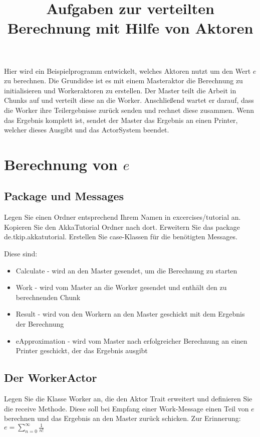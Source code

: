\documentclass[11pt]{tudexercise}
\title{Aufgaben zur verteilten Berechnung mit Hilfe von Aktoren}
\begin{document}
  \maketitle

  Hier wird ein Beispielprogramm entwickelt, welches Aktoren nutzt um den Wert $e$ zu berechnen.
Die Grundidee ist es mit einem Masteraktor die Berechnung zu initialisieren und Workeraktoren zu erstellen. Der Master teilt die Arbeit in Chunks auf und verteilt diese an die Worker. Anschließend wartet er darauf, dass die Worker ihre Teilergebnisse zurück senden und rechnet diese zusammen. Wenn das Ergebnis komplett ist, sendet der Master das Ergebnis an einen Printer, welcher dieses Ausgibt und das ActorSystem beendet.

\section{Berechnung von $e$}

\subsection{Package und Messages}

Legen Sie einen Ordner entsprechend Ihrem Namen in excercises/tutorial an. Kopieren Sie den AkkaTutorial Ordner nach dort. Erweitern Sie das package de.tkip.akkatutorial. Erstellen Sie case-Klassen für die benötigten Messages.

Diese sind:
\begin{itemize}
\item Calculate - wird an den Master gesendet, um die Berechnung zu starten
\item Work - wird vom Master an die Worker gesendet und enthält den zu berechnenden Chunk
\item Result - wird von den Workern an den Master geschickt mit dem Ergebnis der Berechnung
\item eApproximation - wird vom Master nach erfolgreicher Berechnung an einen Printer geschickt, der das Ergebnis ausgibt
\end{itemize}

\subsection{Der WorkerActor}

Legen Sie die Klasse Worker an, die den Aktor Trait erweitert und definieren Sie die receive Methode. Diese soll bei Empfang einer Work-Message einen Teil von $e$ berechnen und das Ergebnis an den Master zurück schicken. Zur Erinnerung: $e = \sum_{n=0}^{\infty}{\frac{1}{n!}}$
\end{document}

